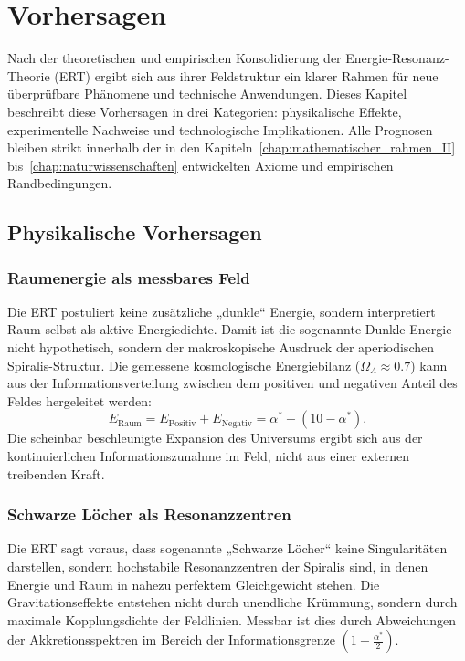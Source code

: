 \chapter{Vorhersagen}
\label{chap:vorhersagen}

Nach der theoretischen und empirischen Konsolidierung der Energie-Resonanz-Theorie (\acrshort{ERT}) ergibt sich aus ihrer Feldstruktur ein klarer Rahmen für neue überprüfbare Phänomene und technische Anwendungen. 
Dieses Kapitel beschreibt diese Vorhersagen in drei Kategorien: physikalische Effekte, experimentelle Nachweise und technologische Implikationen. 
Alle Prognosen bleiben strikt innerhalb der in den Kapiteln~\ref{chap:mathematischer_rahmen_II} bis~\ref{chap:naturwissenschaften} entwickelten Axiome und empirischen Randbedingungen.

\section{Physikalische Vorhersagen}
\label{sec:physikalisch}
\subsection{Raumenergie als messbares Feld}
Die \acrshort{ERT} postuliert keine zusätzliche „dunkle“ Energie, sondern interpretiert Raum selbst als aktive Energiedichte. 
Damit ist die sogenannte Dunkle Energie nicht hypothetisch, sondern der makroskopische Ausdruck der aperiodischen Spiralis-Struktur. 
Die gemessene kosmologische Energiebilanz (\(\Omega_\Lambda \approx 0.7\)) kann aus der Informationsverteilung zwischen dem positiven und negativen Anteil des Feldes hergeleitet werden:
\[
E_\text{Raum} = E_\text{Positiv} + E_\text{Negativ} = \alpha^* + (10 - \alpha^*).
\]
Die scheinbar beschleunigte Expansion des Universums ergibt sich aus der kontinuierlichen Informationszunahme im Feld, 
nicht aus einer externen treibenden Kraft.

\subsection{Schwarze Löcher als Resonanzzentren}
Die \acrshort{ERT} sagt voraus, dass sogenannte „Schwarze Löcher“ keine Singularitäten darstellen, 
sondern hochstabile Resonanzzentren der Spiralis sind, in denen Energie und Raum in nahezu perfektem Gleichgewicht stehen. 
Die Gravitationseffekte entstehen nicht durch unendliche Krümmung, sondern durch maximale Kopplungsdichte der Feldlinien. 
Messbar ist dies durch Abweichungen der Akkretionsspektren im Bereich der Informationsgrenze \((1-\tfrac{\alpha^*}{2})\).

